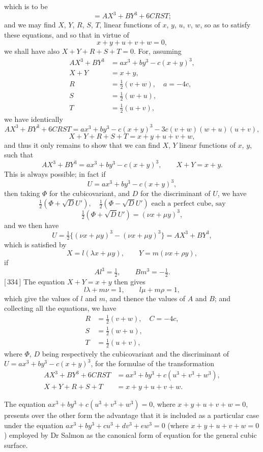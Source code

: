 \documentclass[11pt,a4paper]{article}
\begin{document}
\bigskip

which is to be
\[
= AX^3 + BY^3 + 6CRST;
\]
and we may find $X$, $Y$, $R$, $S$, $T$, linear functions of $x$, $y$, $u$, $v$, $w$, so as to satisfy these equations, and so that in virtue of
\[
x+y+u+v+w=0,
\]
we shall have also $X+Y+R+S+T=0$. For, assuming
\begin{align*}
AX^3 + BY^3 &= ax^3 + by^3 - c(x+y)^3, \\
X+Y &= x+y, \\
R &= \tfrac{1}{2}(v+w), \quad a = -4c, \\
S &= \tfrac{1}{2}(w+u), \\
T &= \tfrac{1}{2}(u+v),
\end{align*}
we have identically
\[
AX^3 + BY^3 + 6CRST = ax^3 + by^3 - c(x+y)^3 - 3c(v+w)(w+u)(u+v),
\]
\[
X+Y+R+S+T = x+y+u+v+w,
\]
and thus it only remains to show that we can find $X$, $Y$ linear functions of $x$, $y$, such that
\[
AX^3 + BY^3 = ax^3 + by^3 - c(x+y)^3, \qquad X+Y = x+y.
\]
This is always possible; in fact if
\[
U = ax^3 + by^3 - c(x+y)^3,
\]
then taking $\Phi$ for the cubicovariant, and $D$ for the discriminant of $U$, we have
\[
\tfrac{1}{2}(\Phi + \sqrt{D}U'), \quad \tfrac{1}{2}(\Phi - \sqrt{D}U') \text{ each a perfect cube, say}
\]
\[
\tfrac{1}{2}(\Phi + \sqrt{D}U') = (\nu x + \mu y)^3,
\]
and we then have
\[
U = \tfrac{1}{2}\{(\nu x + \mu y)^3 - (\nu x + \mu y)^3\} = AX^3 + BY^3,
\]
which is satisfied by
\[
X = l(\lambda x + \mu y), \qquad Y = m(\nu x + \rho y),
\]
if
\[
Al^3 = \tfrac{1}{2}, \qquad Bm^3 = -\tfrac{1}{2}.
\]
[\,334\,] The equation $X+Y = x+y$ then gives
\[
l\lambda + m\nu = 1, \qquad l\mu + m\rho = 1,
\]
which give the values of $l$ and $m$, and thence the values of $A$ and $B$; and collecting all the equations, we have
\begin{align*}
R &= \tfrac{1}{2}(v+w), \quad C = -4c, \\
S &= \tfrac{1}{2}(w+u), \\
T &= \tfrac{1}{2}(u+v),
\end{align*}
where $\Phi$, $D$ being respectively the cubicovariant and the discriminant of $U = ax^3 + by^3 - c(x+y)^3$, for the formulae of the transformation
\begin{align*}
AX^3 + BY^3 + 6CRST &= ax^3 + by^3 + c(u^3+v^3+w^3), \\
X+Y+R+S+T &= x+y+u+v+w.
\end{align*}

The equation $ax^3 + by^3 + c(u^3+v^3+w^3) = 0$, where $x+y+u+v+w=0$, presents over the other form the advantage that it is included as a particular case under the equation $ax^3+by^3+cu^3+dv^3+ew^3=0$ (where $x+y+u+v+w=0$) employed by Dr Salmon as the canonical form of equation for the general cubic surface.
\end{document}
